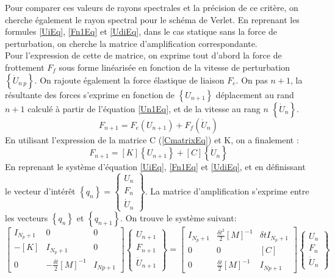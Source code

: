 \documentclass[11pt, a4paper]{article}
\begin{document}
Pour comparer ces valeurs de rayons spectrales et la précision de ce critère, on cherche également le rayon spectral pour le schéma de Verlet. En reprenant les formules \ref{UiEq}, \ref{Fn1Eq} et \ref{UdiEq}, dans le cas statique sans la force de perturbation, on cherche la matrice d'amplification correspondante.
\\

Pour l'expression de cette de matrice, on exprime tout d'abord la force de frottement $F_f$ sous forme linéarisée en fonction de la vitesse de perturbation $\left\{ \dot{U}_{n \ p} \right\}$. On rajoute également la force élastique de liaison $F_e$. On pas $n+1$, la résultante des forces s'exprime en fonction de $\left\{ U_{n+1} \right\}$ déplacement au rand $n+1$ calculé à partir de l'équation \ref{Un1Eq}, et de la vitesse au rang $n$  $\left\{ \dot{U}_n \right\}$.
$$ F_{n+1} = F_e(U_{n+1}) + F_f(\dot{U}_n)$$
En utilisant l'expression de la matrice C (\ref{CmatrixEq}) et K, on a finalement :
\begin{equation}
	F_{n+1} = [K] \left\{ U_{n+1} \right\} + [C] \left\{ \dot{U}_n \right\} 
	\label{Fn1Eq2}
\end{equation}
En reprenant le système d'équation \ref{UiEq}, \ref{Fn1Eq} et \ref{UdiEq}, et en définissant le vecteur d'intérêt $\left\{ q_n \right\} = \begin{Bmatrix} U_n \\ F_n \\ \dot{U}_n \end{Bmatrix} $. La matrice d'amplification s'exprime entre les vecteurs $\left\{ q_n \right\}$ et $\left\{ q_{n+1} \right\}$. On trouve le système suivant:
\begin{equation}
	\begin{bmatrix} I_{N_p +1 } & 0 & 0 \\ -[K]&I_{N_p +1}& 0 \\ 0 & -\frac{\delta t}{2} [M]^{-1} & I_{Np +1}\end{bmatrix} \begin{Bmatrix} U_{n+1} \\ F_{n+1} \\ \dot{U}_{n+1} \end{Bmatrix} = \begin{bmatrix} I_{N_p +1 } & \frac{\delta t^2}{2} [M]^{-1} & \delta t I_{N_p +1} \\ 0 &0 & [C] \\ 0 & \frac{\delta t}{2} [M]^{-1} & I_{Np +1}\end{bmatrix} \begin{Bmatrix} U_{n} \\ F_{n} \\ \dot{U}_{n} \end{Bmatrix} 
	\label{SysVerletEq}
\end{equation}
\end{document}
